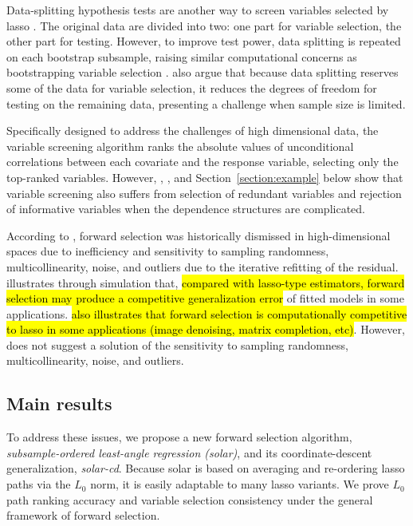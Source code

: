 \documentclass[11pt,review,authoryear]{elsarticle}
\begin{document}
Data-splitting hypothesis tests are another way to screen variables selected by lasso \citep{wasserman2009high, meinshausen2009p,barber2019knockoff,romano2019multiple, diciccio2020exact}. The original data are divided into two: one part for variable selection, the other part for testing. However, to improve test power, data splitting is repeated on each bootstrap subsample, raising similar computational concerns as bootstrapping variable selection \citep{bach2008bolasso,meinshausen2010stability}. \citet{diciccio2020exact} also argue that because data splitting reserves some of the data for variable selection, it reduces the degrees of freedom for testing on the remaining data, presenting a challenge when sample size is limited.

Specifically designed to address the challenges of high dimensional data, the variable screening algorithm \citep{fan2008sure, hall2009using,hall2009usingb, li2012robust, li2012feature} ranks the absolute values of unconditional correlations between each covariate and the response variable, selecting only the top-ranked variables. However, \citet{fan2008sure}, \citet{barut2016conditional}, and Section~\ref{section:example} below show that variable screening also suffers from selection of redundant variables and rejection of informative variables when the dependence structures are complicated.

According to \citet{friedman2001elements, weisberg04}, forward selection \citep{efroymson1966stepwise, draper1966applied} was historically dismissed in high-dimensional spaces due to inefficiency and sensitivity to sampling randomness, multicollinearity, noise, and outliers due to the iterative refitting of the residual. \citet{tibshirani2015general} illustrates through simulation that, \hl{compared with lasso-type estimators, forward selection may produce a competitive generalization error} of fitted models in some applications. \citet{tibshirani2015general} \hl{also illustrates that forward selection is computationally competitive to lasso in some applications (image denoising, matrix completion, etc)}. However, \citet{tibshirani2015general} does not suggest a solution of the sensitivity to sampling randomness, multicollinearity, noise, and outliers.

\subsection{Main results}

To address these issues, we propose a new forward selection algorithm, \emph{subsample-ordered least-angle regression (solar)}, and its coordinate-descent generalization, \emph{solar-cd}. Because solar is based on averaging and re-ordering lasso paths via the $L_0$ norm, it is easily adaptable to many lasso variants. We prove $L_0$ path ranking accuracy and variable selection consistency under the \citet{zhang09} general framework of forward selection.
\end{document}
